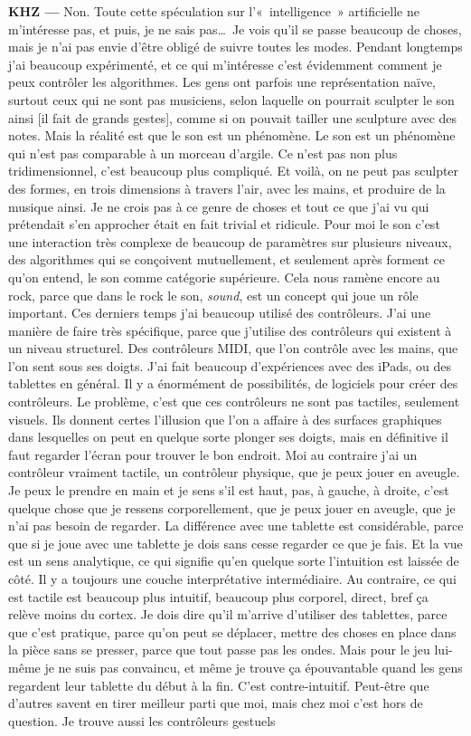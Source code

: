 \documentclass[a4paper,12pt]{article}
\newcommand{\guill}[1]{«~#1~»}
\begin{document}
\textbf{KHZ ---} Non. Toute cette spéculation sur l'\guill{intelligence} artificielle ne m'intéresse pas, et puis, je ne sais pas\dots~Je vois qu'il se passe beaucoup de choses, mais je n'ai pas envie d'être obligé de suivre toutes les modes. Pendant longtemps j'ai beaucoup expérimenté, et ce qui m'intéresse c'est évidemment comment je peux contrôler les algorithmes. Les gens ont parfois une représentation naïve, surtout ceux qui ne sont pas musiciens, selon laquelle on pourrait sculpter le son ainsi [il fait de grands gestes], comme si on pouvait tailler une sculpture avec des notes. Mais la réalité est que le son est un phénomène. Le son est un phénomène qui n'est pas comparable à un morceau d'argile. Ce n'est pas non plus tridimensionnel, c'est beaucoup plus compliqué. Et voilà, on ne peut pas sculpter des formes, en trois dimensions à travers l'air, avec les mains, et produire de la musique ainsi. Je ne crois pas à ce genre de choses et tout ce que j'ai vu qui prétendait s'en approcher était en fait trivial et ridicule. Pour moi le son c'est une interaction très complexe de beaucoup de paramètres sur plusieurs niveaux, des algorithmes qui se conçoivent mutuellement, et seulement après forment ce qu'on entend, le son comme catégorie supérieure. Cela nous ramène encore au rock, parce que dans le rock le son, \emph{sound}, est un concept qui joue un rôle important. Ces derniers temps j'ai beaucoup utilisé des contrôleurs. J'ai une manière de faire très spécifique, parce que j'utilise des contrôleurs qui existent à un niveau structurel. Des contrôleurs MIDI, que l'on contrôle avec les mains, que l'on sent sous ses doigts. J'ai fait beaucoup d'expériences avec des iPads, ou des tablettes en général. Il y a énormément de possibilités, de logiciels pour créer des contrôleurs. Le problème, c'est que ces contrôleurs ne sont pas tactiles, seulement visuels. Ils donnent certes l'illusion que l'on a affaire à des surfaces graphiques dans lesquelles on peut en quelque sorte plonger ses doigts, mais en définitive il faut regarder l'écran pour trouver le bon endroit. Moi au contraire j'ai un contrôleur vraiment tactile, un contrôleur physique, que je peux jouer en aveugle. Je peux le prendre en main et je sens s'il est haut, pas, à gauche, à droite, c'est quelque chose que je ressens corporellement, que je peux jouer en aveugle, que je n'ai pas besoin de regarder. La différence avec une tablette est considérable, parce que si je joue avec une tablette je dois sans cesse regarder ce que je fais. Et la vue est un sens analytique, ce qui signifie qu'en quelque sorte l'intuition est laissée de côté. Il y a toujours une couche interprétative intermédiaire. Au contraire, ce qui est tactile est beaucoup plus intuitif, beaucoup plus corporel, direct, bref ça relève moins du cortex. Je dois dire qu'il m'arrive d'utiliser des tablettes, parce que c'est pratique, parce qu'on peut se déplacer, mettre des choses en place dans la pièce sans se presser, parce que tout passe pas les ondes. Mais pour le jeu lui-même je ne suis pas convaincu, et même je trouve ça épouvantable quand les gens regardent leur tablette du début à la fin. C'est contre-intuitif. Peut-être que d'autres savent en tirer meilleur parti que moi, mais chez moi c'est hors de question. Je trouve aussi les contrôleurs gestuels 
\end{document}
